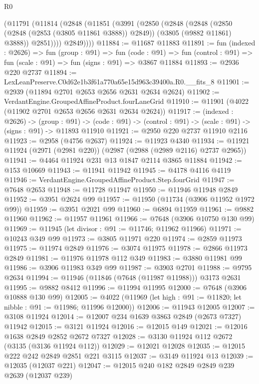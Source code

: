 \begin{lexlean}{R0}
\begin{coremodule}
      (@11791
        (@11814
          (@2848
            (@11851
              (@3991
                (@2850
                  (@2848
                    (@2848
                      (@2850 (@2848 (@2853 (@3805 @11861 @3888)) @2849))
                      (@3805 (@9882 @11861) @3888))
                    @2851))))
            @2849))))
@11884 := @11687 @11883
@11891 := fun (indexed : @2626) =>
  fun (group : @91) =>
  fun (code : @91) => fun (control : @91) => fun (scale : @91) => fun (signs : @91) => @3867 @11884
@11893 := @2936 @220 @2737
@11894 := LexLeanPreserve.C0d62e1b3f61a770a65e15d963c39400a.R0.__fits_8
@11901 := @2939 (@11894 @2701 @2653 @2656 @2631 @2634 @2624)
@11902 := VerdantEngine.GroupedAffineProduct.fourLaneGrid
@11910 := @11901 (@4022 (@11902 @2701 @2653 @2656 @2631 @2634 @2624))
@11917 := (indexed : @2626) ->
  (group : @91) ->
  (code : @91) -> (control : @91) -> (scale : @91) -> (signs : @91) -> @11893 @11910
@11921 := @2950 @220 @2737 @11910 @2116
@11923 := @2958 (@4756 @2637)
@11924 := @11923 @4340
@11934 := @11921 @11924 (@2971 (@2981 @220)) (@2987 (@2988 (@2989 @2116) @2737 @2965))
@11941 := @4464 @11924 @231 @13 @1847 @2114 @3865 @11884
@11942 := @153 @10669
@11943 := @11941 @11942
@11945 := @4178 @4116 @4119
@11946 := VerdantEngine.GroupedAffineProduct.Step.fourGrid
@11947 := @7648 @2653
@11948 := @11728 @11947
@11950 := @11946 @11948 @2849
@11952 := @3951 @2624 @99
@11957 := @11950 (@11734 (@3906 @11952 @1972 @99))
@11959 := @3951 @2021 @99
@11960 := @6894 @11959
@11961 := @9882 @11960
@11962 := @11957 @11961
@11966 := @7648 (@3906 @10750 @130 @99)
@11969 := @11945 (let divisor : @91 := @11746; @11962 @11966)
@11971 := @10243 @349 @99
@11973 := @3805 @11971 @220
@11974 := @2859 @11973
@11975 := @11974 @2849
@11976 := @3074 @11975
@11978 := @2866 @11973 @2849
@11981 := @11976 @11978 @112 @349
@11983 := @3880 @11981 @99
@11986 := @3906 @11983 @349 @99
@11987 := @3903 @2701
@11988 := @9795 @2634
@11994 := @11946 (@11846 (@7648 (@11987 @11988))) @3173 @2631
@11995 := @9882 @8412
@11996 := @11994 @11995
@12000 := @7648 (@3906 @10888 @130 @99)
@12005 := @4022 (@11969 (let high : @91 := @11820; let nibble : @91 := @11986; @11996 @12000))
@12006 := @11943 @12005
@12007 := @3108 @11924
@12014 := @12007 @234 @1639 @3863 @2849 (@2673 @7327) @11942
@12015 := @3121 @11924
@12016 := @12015 @149
@12021 := @12016 @1638 @2849 @2852 @2672 @7327
@12028 := @3130 @11924 @112 @2672 (@3135 (@3136 @11924 @112))
@12029 := @12021 @12028
@12035 := @12015 @222 @242 @2849 @2851 @221 @3115
@12037 := @3149 @11924 @13
@12039 := @12035 (@12037 @221)
@12047 := @12015 @240 @182 @2849 @2849 @239 @2639 (@12037 @239)

\end{coremodule}
\end{lexlean}
